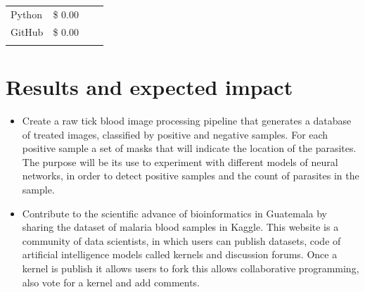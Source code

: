 \documentclass{article}
\begin{document}
\begin{table}[hbt!]
\begin{tabular}{llll}
\multicolumn{1}{|l|}{Python}                                                                                                        & \multicolumn{1}{l|}{\$ 0.00}                                                                               & \multicolumn{1}{l|}{}                                                                                                                                                                                           &  \\ \cline{1-2}
\multicolumn{1}{|l|}{GitHub}                                                                                                        & \multicolumn{1}{l|}{\$ 0.00}                                                                               & \multicolumn{1}{l|}{}                                                                                                                                                                                           &  \\ \cline{1-3}
                                                                                                                                    &                                                                                                            &                                                                                                                                                                                                                 & 
\end{tabular}
\end{table}


\section{Results and expected impact}


\begin{itemize}
\item Create a raw tick blood image processing pipeline that generates a database of treated images, classified by positive and negative samples. For each positive sample a set of masks that will indicate the location of the parasites. The purpose will be its use to experiment with different models of neural networks, in order to detect positive samples and the count of parasites in the sample.
\item Contribute to the scientific advance of bioinformatics in Guatemala by sharing the dataset of malaria blood samples in Kaggle. This website is a community of data scientists, in which users can publish datasets, code of artificial intelligence models called kernels and discussion forums. Once a kernel is publish it allows users to fork this allows collaborative programming, also vote for a kernel and add comments.
\end{itemize}
\end{document}
